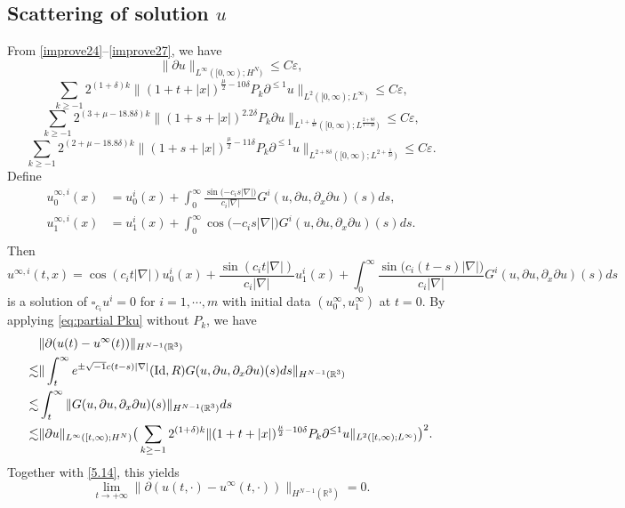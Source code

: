 \documentclass[11pt,twoside]{article}
\def\R{\mathop{\mathbb R\kern 0pt}\nolimits}
\def\f{\frac}
\def\p{\partial}
\def\ls{\lesssim}
\theoremstyle{plain}
\theoremstyle{definition}
\numberwithin{equation}{section}
\begin{document}
\subsection{Scattering of solution $u$}

From \eqref{improve24}--\eqref{improve27}, we have
\begin{equation}\label{YHCCC-103}
\|\p u\|_{L^\infty([0,\infty);H^N)}\le C\varepsilon,	
\end{equation}
\begin{equation}\label{5.14}
\sum_{k\ge-1}2^{(1+\delta) k}\|(1+t+|x|)^{\f{\mu}{2}-10\delta} P_k\p^{\le 1} u\|_{L^{2}([0,\infty);L^\infty)}\le C\varepsilon,
\end{equation}
\begin{equation}\label{6.25}
\sum_{k\ge-1}2^{(3 +\mu -18.8\delta) k} \|(1+s+|x|)^{2.2\delta}P_{k}\p u\|_{L^{1+\f{1}{4\delta}}([0,\infty);L^{\f{2+8\delta}{1-4\delta}})}
\le C\varepsilon,
\end{equation}
\begin{equation}\label{6.26}
\sum_{k\ge-1}2^{(2 +\mu -18.8\delta) k} \|(1+s+|x|)^{\f{\mu}{2}-11\delta}P_{k}\p^{\le 1} u\|_{L^{2+8\delta}([0,\infty);L^{2+\f{1}{2\delta}})}
\le C\varepsilon.
\end{equation}
Define
\begin{equation*}
\begin{split}
u_0^{\infty,i}(x) &= u_0^i(x) + \int_0^\infty \frac{\sin(-c_is|\nabla|\big)}{c_i|\nabla|} G^i(u,\p u,\p_x\p u)(s)ds, \\
u_1^{\infty,i}(x) &= u_1^i(x) + \int_0^\infty \cos(-c_is|\nabla|\big) G^i(u,\p u,\p_x\p u)(s)ds. \\
\end{split}
\end{equation*}
Then
\begin{equation*}
	u^{\infty,i}(t,x) = \cos(c_it|\nabla|)u_0^i(x) + \frac{\sin(c_it|\nabla|)}{c_i|\nabla|}u_1^i(x) + \int_0^\infty \frac{\sin\big(c_i(t-s)|\nabla|\big)}{c_i|\nabla|} G^i(u,\p u,\p_x\p u)(s)ds
\end{equation*}
is a solution of $\square_{c_i} u^i = 0$ for $i = 1,\cdots,m$ with initial data $(u_0^\infty,u_1^\infty)$ at $t = 0$.
By applying \eqref{eq:partial Pku} without $P_k$, we have
\begin{equation*}
\begin{split}
&\|\p(u(t)-u^\infty(t))\|_{H^{N-1}(\R^3)}\\
\ls &\|\int_t^\infty  e^{\pm \sqrt{-1}c(t-s)|\nabla|} (\mathrm{Id},R)  G(u,\partial u,\p_x\p u)(s)ds\|_{H^{N-1}(\R^3)}\\
\ls &\int_t^\infty  \|G(u,\partial u,\p_x\p u)(s)\|_{H^{N-1}(\R^3)}ds\\
\ls & \|\p u\|_{L^\infty([t,\infty);H^N)}\big(\sum_{k\ge-1}2^{(1+\delta) k}\|(1+t+|x|)^{\f{\mu}{2}-10\delta}P_k\p^{\le 1} u\|_{L^{2}([t,\infty); L^\infty)}\big)^2.
\end{split}	
\end{equation*}
Together with \eqref{5.14}, this yields
\begin{equation*}
\lim_{t \to +\infty} \|\partial (u(t,\cdot) - u^\infty(t,\cdot))\|_{H^{N-1}(\mathbb{R}^3)} = 0.	
\end{equation*}
\end{document}
